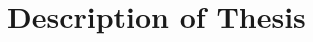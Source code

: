 \documentclass[b5paper,10pt,twoside,parskip=half,numbers=noenddot,bibliography=totocnumbered,listof = totoc]{scrbook}
\begin{document}

\frontmatter


\cleardoublepage


\cleardoublepage
\dominitoc
\tableofcontents
\cleardoublepage

\cleardoublepage

\cleardoublepage
%

\mainmatter

\part{Description of Thesis}






\footnotesize
{} %

\normalsize

\appendix
%

%
\end{document}
